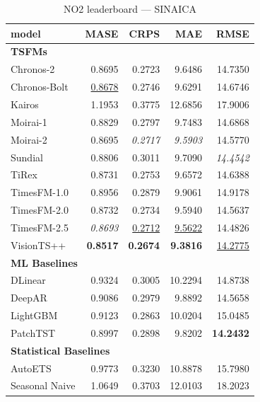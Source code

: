 \begin{table}[H]
\caption{NO2 leaderboard --- SINAICA}
\centering
\begin{small}
\begin{tabular}{lrrrr}
\toprule
model & MASE & CRPS & MAE & RMSE \\
\midrule
\multicolumn{5}{l}{\textbf{TSFMs}} \\
Chronos-2 & 0.8695 & 0.2723 & 9.6486 & 14.7350 \\
Chronos-Bolt & \underline{0.8678} & 0.2746 & 9.6291 & 14.6746 \\
Kairos & 1.1953 & 0.3775 & 12.6856 & 17.9006 \\
Moirai-1 & 0.8829 & 0.2797 & 9.7483 & 14.6868 \\
Moirai-2 & 0.8695 & \textit{0.2717} & \textit{9.5903} & 14.5770 \\
Sundial & 0.8806 & 0.3011 & 9.7090 & \textit{14.4542} \\
TiRex & 0.8731 & 0.2753 & 9.6572 & 14.6388 \\
TimesFM-1.0 & 0.8956 & 0.2879 & 9.9061 & 14.9178 \\
TimesFM-2.0 & 0.8732 & 0.2734 & 9.5940 & 14.5637 \\
TimesFM-2.5 & \textit{0.8693} & \underline{0.2712} & \underline{9.5622} & 14.4826 \\
VisionTS++ & \textbf{0.8517} & \textbf{0.2674} & \textbf{9.3816} & \underline{14.2775} \\
\midrule
\multicolumn{5}{l}{\textbf{ML Baselines}} \\
DLinear & 0.9324 & 0.3005 & 10.2294 & 14.8738 \\
DeepAR & 0.9086 & 0.2979 & 9.8892 & 14.5658 \\
LightGBM & 0.9123 & 0.2863 & 10.0204 & 15.0485 \\
PatchTST & 0.8997 & 0.2898 & 9.8202 & \textbf{14.2432} \\
\midrule
\multicolumn{5}{l}{\textbf{Statistical Baselines}} \\
AutoETS & 0.9773 & 0.3230 & 10.8878 & 15.7980 \\
Seasonal Naive & 1.0649 & 0.3703 & 12.0103 & 18.2023 \\
\bottomrule
\end{tabular}
\end{small}
\end{table}